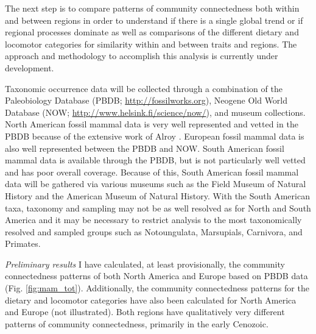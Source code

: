 \documentclass[12pt,letterpaper]{article}
\begin{document}
The next step is to compare patterns of community connectedness both within and between regions in order to understand if there is a single global trend or if regional processes dominate as well as comparisons of the different dietary and locomotor categories for similarity within and between traits and regions. The approach and methodology to accomplish this analysis is currently under development. 

Taxonomic occurrence data will be collected through a combination of the Paleobiology Database (PBDB; \url{http://fossilworks.org}), Neogene Old World Database (NOW; \url{http://www.helsink.fi/science/now/}), and museum collections. North American fossil mammal data is very well represented and vetted in the PBDB because of the extensive work of Alroy \citep{Alroy1996a,Alroy1998,Alroy2000g}. European fossil mammal data is also well represented between the PBDB and NOW. South American fossil mammal data is available through the PBDB, but is not particularly well vetted and has poor overall coverage. Because of this, South American fossil mammal data will be gathered via various museums such as the Field Museum of Natural History and the American Museum of Natural History. With the South American taxa, taxonomy and sampling may not be as well resolved as for North and South America and it may be necessary to restrict analysis to the most taxonomically resolved and sampled groups such as Notoungulata, Marsupials, Carnivora, and Primates.


\textit{Preliminary results}
I have calculated, at least provisionally, the community connectedness patterns of both North America and Europe based on PBDB data (Fig. \ref{fig:mam_tot}). Additionally, the community connectedness patterns for the dietary and locomotor categories have also been calculated for North America and Europe (not illustrated). Both regions have qualitatively very different patterns of community connectedness, primarily in the early Cenozoic.
\end{document}

